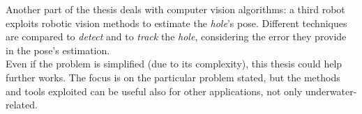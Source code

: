 \begin{abstracts}
Another part of the thesis deals with computer vision algorithms: a third robot exploits robotic vision methods to estimate the \textit{hole}'s pose. Different techniques are compared to \textit{detect} and to \textit{track} the \textit{hole}, considering the error they provide in the pose's estimation.\\
Even if the problem is simplified (due to its complexity), this thesis could help further works. The focus is on the particular problem stated, but the methods and tools exploited can be useful also for other applications, not only underwater-related. 

\end{abstracts}

\restoregeometry